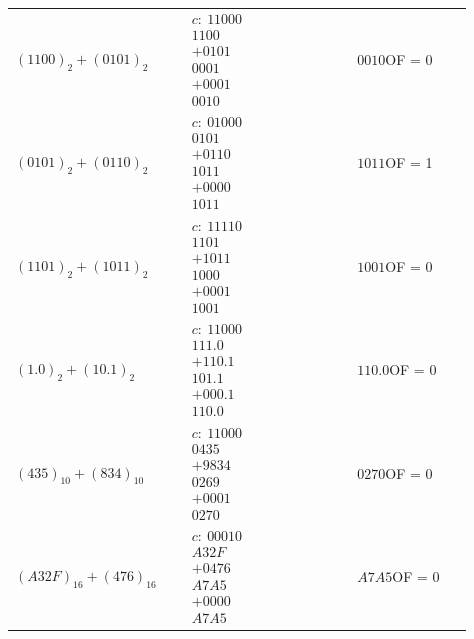 \documentclass[a4paper,11pt]{article}
\numberwithin{equation}{section}
\newcommand{\redlinija}{\arrayrulecolor{black!28}\specialrule{0.3pt}{2pt}{2pt}\arrayrulecolor{black}}
\begin{document}
\begin{longtable}{p{0.34\linewidth} p{0.34\linewidth} p{0.23\linewidth}}
\redlinija
$(1100)_{2}+(0101)_{2}$ & $\begin{array}{r}c:\ 11000\\1100\\+0101\\\hline 0001\\+0001\\\hline 0010\end{array}$ & $0010$\newline OF = 0\\[5pt]
\redlinija
$(0101)_{2}+(0110)_{2}$ & $\begin{array}{r}c:\ 01000\\0101\\+0110\\\hline 1011\\+0000\\\hline 1011\end{array}$ & $1011$\newline OF = 1\\[5pt]
\redlinija
$(1101)_{2}+(1011)_{2}$ & $\begin{array}{r}c:\ 11110\\1101\\+1011\\\hline 1000\\+0001\\\hline 1001\end{array}$ & $1001$\newline OF = 0\\[5pt]
\redlinija
$(1.0)_{2}+(10.1)_{2}$ & $\begin{array}{r}c:\ 11000\\111.0\\+110.1\\\hline 101.1\\+000.1\\\hline 110.0\end{array}$ & $110.0$\newline OF = 0\\[5pt]
\redlinija
$(435)_{10}+(834)_{10}$ & $\begin{array}{r}c:\ 11000\\0435\\+9834\\\hline 0269\\+0001\\\hline 0270\end{array}$ & $0270$\newline OF = 0\\[5pt]
\redlinija
$(A32F)_{16}+(476)_{16}$ & $\begin{array}{r}c:\ 00010\\A32F\\+0476\\\hline A7A5\\+0000\\\hline A7A5\end{array}$ & $A7A5$\newline OF = 0\\[5pt]

\end{longtable}
\end{document}
